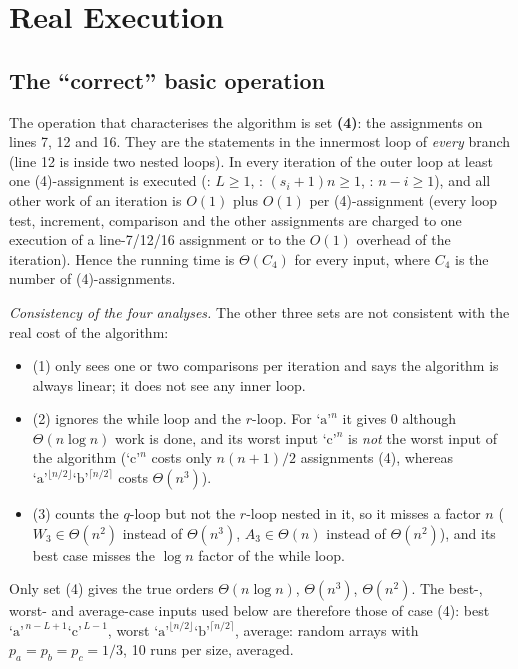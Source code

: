 \documentclass[11pt]{article}
\newcommand{\cha}{\text{`a'}}
\newcommand{\chb}{\text{`b'}}
\newcommand{\chc}{\text{`c'}}
\theoremstyle{remark}
\begin{document}
\section{Real Execution}

\subsection{The ``correct'' basic operation}

The operation that characterises the algorithm is set \textbf{(4)}: the assignments on
lines 7, 12 and 16. They are the statements in the innermost loop of \emph{every} branch
(line 12 is inside two nested loops). In every iteration of the outer loop at least one
(4)-assignment is executed (\cha: $L\ge1$, \chb: $(s_i+1)n\ge1$, \chc: $n-i\ge1$), and all
other work of an iteration is $O(1)$ plus $O(1)$ per (4)-assignment (every loop test,
increment, comparison and the other assignments are charged to one execution of a
line-7/12/16 assignment or to the $O(1)$ overhead of the iteration). Hence the running time
is $\Theta(C_4)$ for every input, where $C_4$ is the number of (4)-assignments.

\emph{Consistency of the four analyses.} The other three sets are not consistent with the
real cost of the algorithm:
\begin{itemize}[nosep]
\item (1) only sees one or two comparisons per iteration and says the algorithm is
  always linear; it does not see any inner loop.
\item (2) ignores the while loop and the $r$-loop. For $\cha^n$ it gives 0 although
  $\Theta(n\log n)$ work is done, and its worst input $\chc^n$ is \emph{not} the worst input of the
  algorithm ($\chc^n$ costs only $n(n+1)/2$ assignments (4), whereas
  $\cha^{\lfloor n/2\rfloor}\chb^{\lceil n/2\rceil}$ costs $\Theta(n^3)$).
\item (3) counts the $q$-loop but not the $r$-loop nested in it, so it misses a factor $n$
  ($W_3\in\Theta(n^2)$ instead of $\Theta(n^3)$, $A_3\in\Theta(n)$ instead of $\Theta(n^2)$), and its best case misses the $\log n$ factor of the while loop.
\end{itemize}
Only set (4) gives the true orders $\Theta(n\log n)$, $\Theta(n^3)$, $\Theta(n^2)$. The
best-, worst- and average-case inputs used below are therefore those of case (4):
best $\cha^{\,n-L+1}\chc^{\,L-1}$, worst $\cha^{\lfloor n/2\rfloor}\chb^{\lceil n/2\rceil}$,
average: random arrays with $p_a=p_b=p_c=1/3$, 10 runs per size, averaged.
\end{document}
